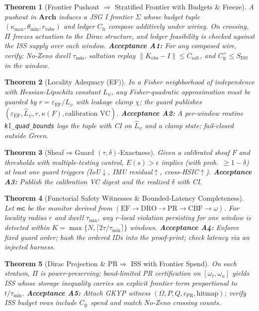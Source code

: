 \documentclass[10pt]{article}
\newtheorem{theorem}{Theorem}
\begin{document}
\begin{theorem}[Frontier Pushout $\Rightarrow$ Stratified Frontier with Budgets \& Freeze]
A pushout in $\mathbf{Arch}$ induces a JSG I frontier $\Sigma$ whose budget tuple $(\kappa_{\max},\theta_{\min},r_{\mathrm{tube}})$ and ledger $C_{\mathrm{fr}}$ compose additively under wiring. On crossing, $\Pi$ freezes actuation to the Dirac structure, and ledger feasibility is checked against the ISS supply over each window. 
\textbf{Acceptance A1:} For any composed wire, verify: No-Zeno dwell $\tau_{\min}$, saltation replay $\|K_{\mathrm{obs}}-I\|\le C_{\mathrm{salt}}$, and $C_{\mathrm{fr}}^{+}\le S_{\mathrm{ISS}}$ in the window.
\end{theorem}

\begin{theorem}[Locality Adequacy (EF)]
In a Fisher neighborhood of independence with Hessian-Lipschitz constant $L_\psi$, any Fisher-quadratic approximation must be guarded by $r=\varepsilon_{\mathrm{EF}}/L_\psi$ with leakage clamp $\chi$; the guard publishes $(\varepsilon_{\mathrm{EF}},\hat L_\psi,r,\kappa(F),\text{calibration VC})$.
\textbf{Acceptance A2:} A per-window routine \texttt{kl\_quad\_bounds} logs the tuple with CI on $\hat L_\psi$ and a clamp state; fail-closed outside Green.
\end{theorem}

\begin{theorem}[Sheaf$\Rightarrow$Guard $(\tau,\delta)$-Exactness]
Given a calibrated sheaf $F$ and thresholds with multiple-testing control, $E(s)>\epsilon$ implies (with prob.\ $\ge 1-\delta$) at least one guard triggers (IoU$\downarrow$, IMU residual$\uparrow$, cross-HSIC$\uparrow$).
\textbf{Acceptance A3:} Publish the calibration VC digest and the realized $\delta$ with CI.
\end{theorem}

\begin{theorem}[Functorial Safety Witnesses \& Bounded-Latency Completeness]
Let $\mathsf{mc}$ be the monitor derived from $(\text{EF}\!\to\!\text{DRO}\!\to\!\text{PR}\!\to\!\text{CBF}\!\to\!\omega)$. For locality radius $r$ and dwell $\tau_{\min}$, any $r$-local violation persisting for one window is detected within $K=\max\{N,\lceil 2\tau/\tau_{\min}\rceil\}$ windows. 
\textbf{Acceptance A4:} Enforce fixed guard order; hash the ordered IDs into the proof-print; check latency via an injected harness.
\end{theorem}

\begin{theorem}[Dirac Projection \& PR$\Rightarrow$ ISS with Frontier Spend]
On each stratum, $\Pi$ is power-preserving; band-limited PR certification on $[\omega_\ell,\omega_u]$ yields ISS whose storage inequality carries an explicit frontier term proportional to $t/\tau_{\min}$.
\textbf{Acceptance A5:} Attach GKYP witness $(\Omega,P,Q,\epsilon_{\mathrm{PR}},\text{hitmap})$; verify ISS budget rows include $C_{\mathrm{fr}}$ spend and match No-Zeno crossing counts.
\end{theorem}
\end{document}
